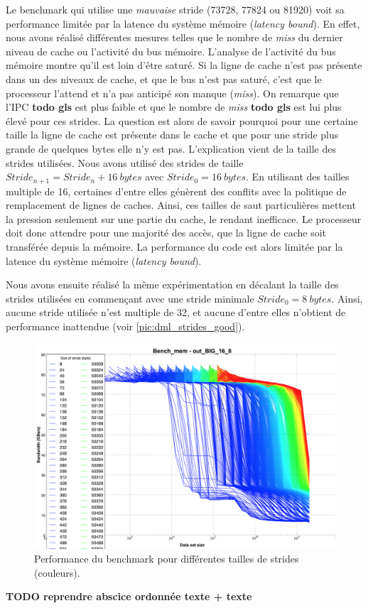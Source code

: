         
        Le benchmark qui utilise une \textit{mauvaise} stride (73728, 77824 ou 81920) voit sa performance limitée par la latence du système mémoire  (\textit{latency bound}). En effet, nous avons réalisé différentes mesures telles que le nombre de \textit{miss} du dernier niveau de cache ou l'activité du bus mémoire. L'analyse de l'activité du bus mémoire montre qu'il est loin d'être saturé. Si la ligne de cache n'est pas présente dans un des niveaux de cache, et que le bus n'est pas saturé, c'est que le processeur l'attend et n'a pas anticipé son manque (\textit{miss}). On remarque que l'IPC \textbf{todo gls} est plus faible et que le nombre de \textit{miss} \textbf{todo gls} est lui plus élevé pour ces strides. La question est alors de savoir pourquoi pour une certaine taille la ligne de cache est présente dans le cache et que pour une stride plus grande de quelques bytes elle n'y est pas. L'explication vient de la taille des strides utilisées. Nous avons utilisé des strides de taille $ Stride_{n+1} = Stride_n + 16 ~ bytes$ avec $Stride_0 = 16 ~ bytes$. En utilisant des tailles multiple de 16, certaines d'entre elles génèrent des conflits avec la politique de remplacement de lignes de caches. Ainsi, ces tailles de saut particulières mettent la pression seulement sur une partie du cache, le rendant inefficace. Le processeur doit donc attendre pour une majorité des accès, que la ligne de cache soit transférée depuis la mémoire. La performance du code est alors limitée par la latence du système mémoire (\textit{latency bound}).
        
        Nous avons ensuite réalisé la même expérimentation en décalant la taille des strides utilisées en commençant avec une stride minimale $Stride_0 =  8 ~ bytes$. Ainsi, aucune stride utilisée n'est multiple de 32, et aucune d'entre elles n’obtient de performance inattendue (voir \autoref{pic:dml_strides_good}).
        
        
        \begin{figure}
        \center
        \includegraphics[width=12cm]{images/dml_strides.png}
        \caption{\label{pic:dml_strides_good} Performance du benchmark pour différentes tailles de strides (couleurs).  }
        \end{figure}
        \textbf{TODO reprendre abscice ordonnée texte + texte}
        
